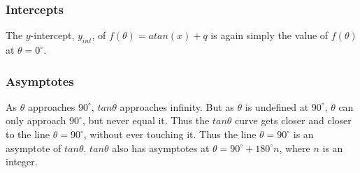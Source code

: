             \subsubsection{ Intercepts}
            \nopagebreak
          \label{m39414*id91406}The $y$-intercept, ${y}_{int}$, of $f\left(\theta \right)=atan\left(x\right)+q$ is again simply the value of $f\left(\theta \right)$ at $\theta ={0}^{\circ }$.\par 
          \label{m39414*id91511}\nopagebreak\noindent{}
        \label{m39414*uid89}
            \subsubsection{ Asymptotes}
            \nopagebreak
          \label{m39414*id91637}As $\theta $ approaches ${90}^{\circ }$, $tan\theta $ approaches infinity. But as $\theta $ is undefined at ${90}^{\circ }$, $\theta $ can only approach ${90}^{\circ }$, but never equal it. Thus the $tan\theta $ curve gets closer and closer to the line $\theta ={90}^{\circ }$, without ever touching it. Thus the line $\theta ={90}^{\circ }$ is an asymptote of $tan\theta $. $tan\theta $ also has asymptotes at $\theta ={90}^{\circ }+{180}^{\circ }n$, where $n$ is an integer.\par 
\label{m39414*secfhsst!!!underscore!!!id3393}
